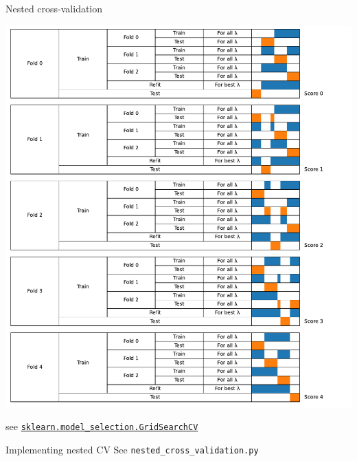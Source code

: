 \documentclass[presentation,mathserif,table]{beamer}
\begin{document}
\begin{frame}[label={sec:orgfa7622e},fragile]{Nested cross-validation}
 \begin{center}
\includegraphics[width=.9\linewidth]{cv_figure_nested.pdf}
\end{center}
see  \href{https://scikit-learn.org/stable/modules/generated/sklearn.model\_selection.GridSearchCV.html}{\texttt{sklearn.model\_selection.GridSearchCV}}
\end{frame}
\begin{frame}[label={sec:orgfc14eda},fragile]{Implementing nested CV}
 See \texttt{nested\_cross\_validation.py}
\end{frame}
\end{document}
